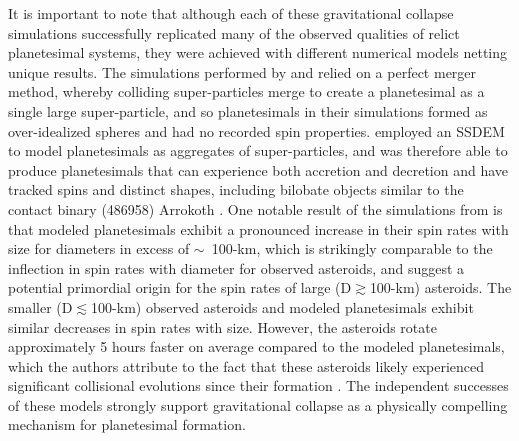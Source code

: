 \documentclass[fleqn,usenatbib]{mnras}
\begin{document}
It is important to note that although each of these gravitational collapse simulations successfully replicated many of the observed qualities of relict planetesimal systems, they were achieved with different numerical models netting unique results.
The simulations performed by \citet{Nesvorny2010,Nesvorny2021} and \citet{Robinson2020} relied on a perfect merger method, whereby colliding super-particles merge to create a planetesimal as a single large super-particle, and so planetesimals in their simulations formed as over-idealized spheres and had no recorded spin properties.
\citet{Barnes2025} employed an SSDEM to model planetesimals as aggregates of super-particles, and was therefore able to produce planetesimals that can experience both accretion and decretion and have tracked spins and distinct shapes, including bilobate objects similar to the contact binary (486958) Arrokoth \citep{Barnes2026}.
One notable result of the simulations from \citet{Barnes2025,Barnes2026} is that modeled planetesimals exhibit a pronounced increase in their spin rates with size for diameters in excess of $\sim$~100-km, which is strikingly comparable to the inflection in spin rates with diameter for observed asteroids, and suggest a potential primordial origin for the spin rates of large (D$\gtrsim$100-km) asteroids.
The smaller (D$\lesssim$100-km) observed asteroids and modeled planetesimals exhibit similar decreases in spin rates with size.
However, the asteroids rotate approximately 5 hours faster on average compared to the modeled planetesimals, which the authors attribute to the fact that these asteroids likely experienced significant collisional evolutions since their formation \citep{Harris1979,Bottke2015}.
The independent successes of these models strongly support gravitational collapse as a physically compelling mechanism for planetesimal formation.
\end{document}
